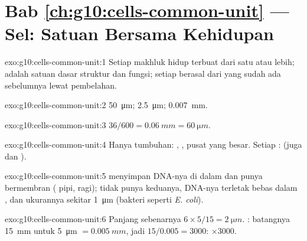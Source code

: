 \section*{Bab \ref{ch:g10:cells-common-unit} --- Sel: Satuan Bersama Kehidupan}

\begin{solution}{exo:g10:cells-common-unit:1}
Setiap makhluk hidup terbuat dari satu  atau lebih;  adalah
satuan dasar struktur dan fungsi; setiap  berasal dari  yang
sudah ada sebelumnya lewat pembelahan.
\end{solution}

\begin{solution}{exo:g10:cells-common-unit:2}
\qty{50}{\micro m}; \qty{2.5}{\micro m}; \qty{0.007}{mm}.
\end{solution}

\begin{solution}{exo:g10:cells-common-unit:3}
$36/600 = \qty{0.06}{mm} = \qty{60}{\micro m}$.
\end{solution}

\begin{solution}{exo:g10:cells-common-unit:4}
Hanya tumbuhan: , ,  pusat yang besar.
Setiap :  (juga  dan ).
\end{solution}

\begin{solution}{exo:g10:cells-common-unit:5}
 menyimpan DNA-nya di dalam  dan punya 
bermembran ( pipi, ragi);  tidak punya keduanya,
DNA-nya terletak bebas dalam , dan ukurannya sekitar
\qty{1}{\micro m} (bakteri seperti \emph{E. coli}).
\end{solution}

\begin{solution}{exo:g10:cells-common-unit:6}
Panjang sebenarnya $6 \times 5/15 = \qty{2}{\micro m}$. :
batangnya \qty{15}{mm} untuk \qty{5}{\micro m} $= \qty{0.005}{mm}$, jadi
$15/0.005 = 3000$: $\times 3000$.
\end{solution}

